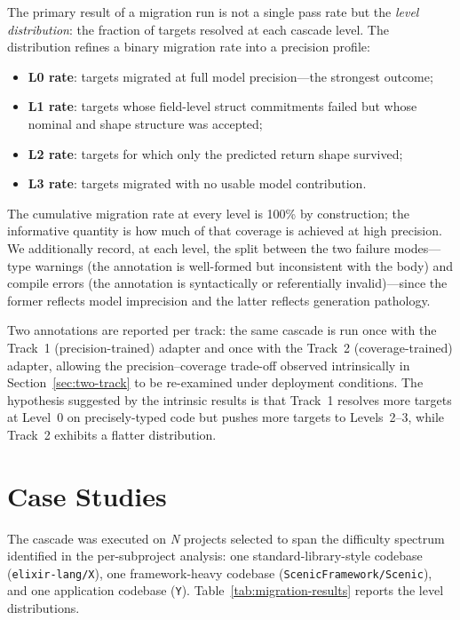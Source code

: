 The primary result of a migration run is not a single pass rate but the \emph{level distribution}: the fraction of targets resolved at each cascade level.
The distribution refines a binary migration rate into a precision profile:
\begin{itemize}
    \item \textbf{L0 rate}: targets migrated at full model precision---the strongest outcome;
    \item \textbf{L1 rate}: targets whose field-level struct commitments failed but whose nominal and shape structure was accepted;
    \item \textbf{L2 rate}: targets for which only the predicted return shape survived;
    \item \textbf{L3 rate}: targets migrated with no usable model contribution.
\end{itemize}
The cumulative migration rate at every level is 100\% by construction; the informative quantity is how much of that coverage is achieved at high precision.
We additionally record, at each level, the split between the two failure modes---type warnings (the annotation is well-formed but inconsistent with the body) and compile errors (the annotation is syntactically or referentially invalid)---since the former reflects model imprecision and the latter reflects generation pathology.

Two annotations are reported per track: the same cascade is run once with the Track~1 (precision-trained) adapter and once with the Track~2 (coverage-trained) adapter, allowing the precision--coverage trade-off observed intrinsically in Section~\ref{sec:two-track} to be re-examined under deployment conditions.
The hypothesis suggested by the intrinsic results is that Track~1 resolves more targets at Level~0 on precisely-typed code but pushes more targets to Levels~2--3, while Track~2 exhibits a flatter distribution.

\section{Case Studies}
\label{sec:migration-case-studies}

The cascade was executed on \emph{N} projects selected to span the difficulty spectrum identified in the per-subproject analysis:
one standard-library-style codebase (\texttt{elixir-lang/X}), one framework-heavy codebase (\texttt{ScenicFramework/Scenic}), and one application codebase (\texttt{Y}).
Table~\ref{tab:migration-results} reports the level distributions.

